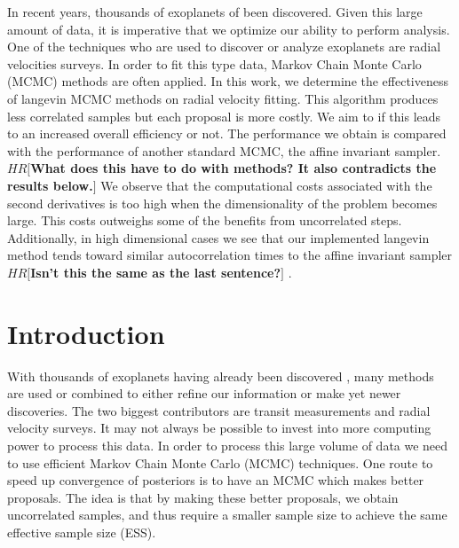 \documentclass{aa}
\def\memohr#1{\color{blue}$HR[${\bf #1}$]$ \color{black}}
\begin{document}
  \abstract
   {In recent years, thousands of exoplanets of been discovered. Given this large amount of data, it is imperative that we optimize our ability to perform analysis. One of the techniques who are used to discover or analyze exoplanets are radial velocities surveys. In order to fit this type data, Markov Chain Monte Carlo (MCMC) methods are often applied.}
   {In this work, we determine the effectiveness of langevin MCMC methods on radial velocity fitting. This algorithm produces less correlated samples but each proposal is more costly. We aim to if this leads to an increased overall efficiency or not.}
   {The performance we obtain is compared with the performance of another standard MCMC, the affine invariant sampler. \memohr{What does this have to do with methods? It also contradicts the results below.}}
   {We observe that the computational costs associated with the second derivatives is too high when the dimensionality of the problem becomes large. This costs outweighs some of the benefits from uncorrelated steps. Additionally, in high dimensional cases we see that our implemented langevin method tends toward similar autocorrelation times to the affine invariant sampler \memohr{Isn't this the same as the last sentence?}.}
   {}


   \maketitle
%
\section{Introduction}
With thousands of exoplanets having already been discovered \cite{exoArchive}, many methods are used or combined to either refine our information or make yet newer discoveries. The two biggest contributors are transit measurements and radial velocity surveys. It may not always be possible to invest into more computing power to process this data. In order to process this large volume of data we need to use efficient Markov Chain Monte Carlo (MCMC) techniques. One route to speed up convergence of posteriors is to have an MCMC which makes better proposals. The idea is that by making these better proposals, we obtain uncorrelated samples, and thus require a smaller sample size to achieve the same effective sample size (ESS).
\end{document}
